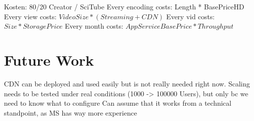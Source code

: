 \documentclass[english]{lni}
\begin{document}
Kosten: 80/20 Creator / SciTube
Every encoding costs: Length * BasePriceHD
Every view costs: $VideoSize * (Streaming+CDN)$
Every vid costs: $Size * StoragePrice$
Every month costs: $AppServiceBasePrice * Throughput$

\section{Future Work}
CDN can be deployed and used easily but is not really needed right now. 
Scaling needs to be tested under real conditions (1000 -> 100000 Users), but only bc we need to know what to configure
Can assume that it works from a technical standpoint, as MS has way more experience
\newpage
\appendix


%


\end{document}
